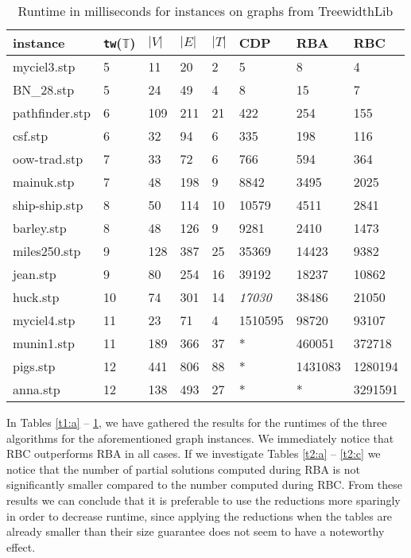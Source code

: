 \documentclass{llncs}
\begin{document}
\begin{table}[!h]
\begin{center}
\begin{tabular}{l l l l l | l l l }
\hline
instance & \texttt{tw}($\mathbb{T}$) & $|V|$ & $|E|$ & $|T|$ & CDP & RBA & RBC\\
\hline
\hline
myciel3.stp	&	5	&	11	&	20	&	2	&	5	&	8	&	4	\\
BN\_28.stp	&	5	&	24	&	49	&	4	&	8	&	15	&	7	\\
pathfinder.stp	&	6	&	109	&	211	&	21	&	422	&	254	&	155	\\
csf.stp	&	6	&	32	&	94	&	6	&	335	&	198	&	116	\\
oow-trad.stp	&	7	&	33	&	72	&	6	&	766	&	594	&	364	\\
mainuk.stp	&	7	&	48	&	198	&	9	&	8842	&	3495	&	2025	\\
ship-ship.stp	& 	8	&	50	&	114	&	10	&	10579	&	4511	&	2841	\\
barley.stp	&	8	&	48	&	126	&	9	&	9281	&	2410	&	1473	\\
miles250.stp	&	9	&	128	&	387	&	25	&	35369	&	14423	&	9382	\\
jean.stp	&	9	&	80	&	254	&	16	&	39192	&	18237	&	10862	\\
huck.stp	&	10	&	74	&	301	&	14	&	\textit{17030}	&	38486	&	21050	\\
myciel4.stp	&	11	&	23	&	71	&	4	&	1510595	&	98720		&	93107 \\
munin1.stp	&	11	&	189	&	366	&	37	&	*	&	460051	&	372718 \\
pigs.stp	&	12	&	441	&	806	&	88	&	*	&	1431083	&	1280194 \\
anna.stp	&	12	&	138	&	493	&	27	&	*	&	*	&	3291591 \\
\hline
\end{tabular}
\end{center}
\caption{Runtime in milliseconds for instances on graphs from TreewidthLib}
\label{t1:c}
\end{table}


In Tables \ref{t1:a} -- \ref{t1:c}, we have gathered the results for the runtimes of the three algorithms for the aforementioned graph instances. 
We immediately notice that RBC outperforms RBA in all cases.
If we investigate Tables \ref{t2:a} -- \ref{t2:c} we notice
that the number of partial solutions computed during RBA is not significantly smaller compared to the number computed during RBC. From these results we can conclude that it is preferable to use the reductions more sparingly in order to decrease runtime, since applying the reductions when the tables are already smaller than their size guarantee does not seem to have a noteworthy effect.
\end{document}
